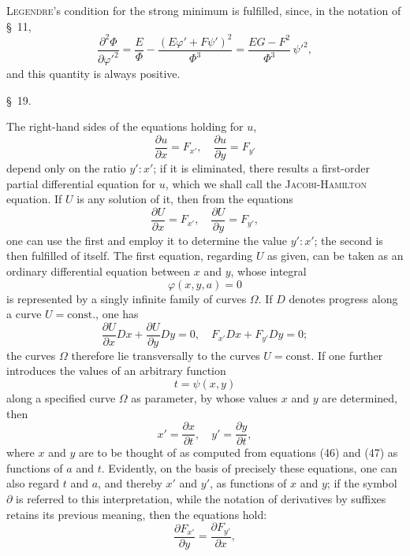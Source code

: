 \documentclass[11pt,a4paper,leqno]{article}
\begin{document}
\textsc{Legendre}'s condition for the strong minimum is fulfilled, since, in the notation of \S~11,
\[
\frac{\partial^2\Phi}{\partial\varphi'^2}
=
\frac{E}{\Phi}
-
\frac{(E\varphi'+F\psi')^2}{\Phi^3}
=
\frac{EG-F^2}{\Phi^3}\,\psi'^2,
\]
and this quantity is always positive.

\begin{center}{\large \S~19.}\end{center}

The right-hand sides of the equations holding for $u$,
\[
\frac{\partial u}{\partial x}=F_{x'},\quad
\frac{\partial u}{\partial y}=F_{y'}
\]
depend only on the ratio $y':x'$; if it is eliminated, there results a first-order partial differential equation for $u$, which we shall call the \textsc{Jacobi-Hamilton} equation. If $U$ is any solution of it, then from the equations
\begin{equation}\tag{45}
\frac{\partial U}{\partial x}=F_{x'},\quad
\frac{\partial U}{\partial y}=F_{y'},
\end{equation}
one can use the first and employ it to determine the value $y':x'$; the second is then fulfilled of itself. The first equation, regarding $U$ as given, can be taken as an ordinary differential equation between $x$ and $y$, whose integral
\begin{equation}\tag{46}
\varphi(x,y,a)=0
\end{equation}
is represented by a singly infinite family of curves $\Omega$. If $D$ denotes progress along a curve $U=\text{const.}$, one has
\[
\frac{\partial U}{\partial x}Dx+\frac{\partial U}{\partial y}Dy=0,\quad
F_{x'}Dx+F_{y'}Dy=0;
\]
the curves $\Omega$ therefore lie transversally to the curves $U=\text{const.}$ If one further introduces the values of an arbitrary function
\begin{equation}\tag{47}
t=\psi(x,y)
\end{equation}
along a specified curve $\Omega$ as parameter, by whose values $x$ and $y$ are determined, then
\[
x'=\frac{\partial x}{\partial t},\quad y'=\frac{\partial y}{\partial t},
\]
where $x$ and $y$ are to be thought of as computed from equations (46) and (47) as functions of $a$ and $t$. Evidently, on the basis of precisely these equations, one can also regard $t$ and $a$, and thereby $x'$ and $y'$, as functions of $x$ and $y$; if the symbol $\partial$ is referred to this interpretation, while the notation of derivatives by suffixes retains its previous meaning, then the equations hold:
\begin{equation}\tag{48}
\frac{\partial F_{x'}}{\partial y}=\frac{\partial F_{y'}}{\partial x},
\end{equation}
\end{document}
